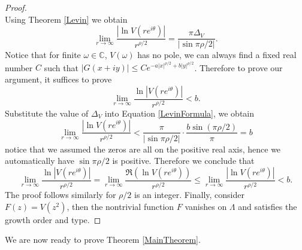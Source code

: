 \documentclass[graybox]{svmult}
\newcommand{\C}{\mathbb{C}}
\begin{document}
\begin{proof}
\begin{equation*}
    \end{equation*}
    Using Theorem \ref{Levin} we obtain 
    \begin{equation}\label{LevinFormula}
        \lim_{r\to \infty}\frac{|\ln V(r e^{i \theta})|}{r^{\rho/2}} = \frac{\pi \Delta_V}{|\sin \pi \rho/2|}.  
    \end{equation}
    Notice that for finite $\omega \in \C$, $V(\omega)$ has no pole, we can always find a fixed real number $C$ such that $|G(x+iy)| \leq C e^{-a|x|^{\rho/2}+b|y|^{\rho/2}}$. Therefore to prove our argument, it suffices to prove 
    \begin{equation*}
        \lim_{r\to \infty}\frac{\ln |V(r e^{i \theta})|}{r^{\rho/2}}< b.
    \end{equation*}
    Substitute the value of $\Delta_V$ into Equation \eqref{LevinFormula}, we obtain
    \begin{equation*}
        \lim_{r\to \infty}\frac{|\ln V(r e^{i \theta})|}{r^{\rho/2}} < \frac{\pi}{|\sin \pi \rho/2|}\cdot\frac{b\sin(\pi \rho/2)}{\pi} =b
    \end{equation*}
    notice that we assumed the zeros are all on the positive real axis, hence we automatically have $\sin \pi \rho/2$ is positive. Therefore we conclude that 
    \begin{equation*}
        \lim_{r \to \infty}\frac{\ln |V(r e^{i \theta})|}{r^{\rho/2}} = \lim_{r \to \infty}\frac{\Re(\ln V(r e^{i \theta}))}{r^{\rho/2}} \leq \lim_{r \to \infty}\frac{|\ln V(r e^{i \theta})|}{r^{\rho/2}}<b.
    \end{equation*}
    The proof follows similarly for $\rho/2$ is an integer. Finally, consider $F(z) = V(z^2)$, then the nontrivial function $F$ vanishes on $\Lambda$ and satisfies the growth order and type. 
\end{proof}
We are now ready to prove Theorem \ref{MainTheorem}. 
\end{document}
